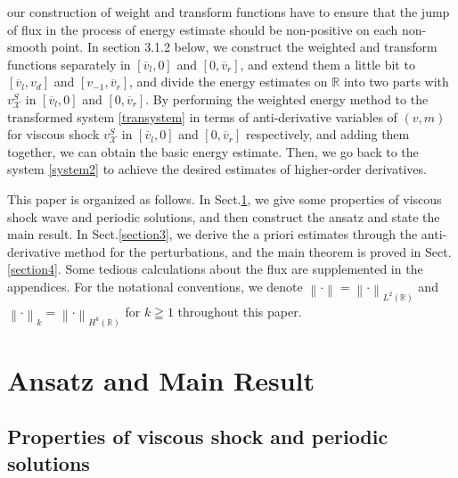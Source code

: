 \documentclass[12pt,reqno]{amsart}
\numberwithin{equation}{section}
\newcommand{\norm}[1]{\left\lVert #1 \right\rVert}
\def\R{\mathbb{R}}
\def\vsx{v^S_{\mathcal{X}}}
\def\avl{\overline{v}_l}
\def\avr{\overline{v}_r}
\begin{document}
our construction of weight and transform functions have to ensure that the jump of flux  in the process of 
energy estimate should be non-positive on each non-smooth point. In section 3.1.2 below, we construct the weighted and transform functions separately in  $[\avl,0]$ and $[0,\avr]$, and extend them a little bit to $[\avl,v_d]$ and $[v_{-1},\avr]$, and divide the energy estimates on $\mathbb{R}$ into two parts with
$\vsx$ in $[\avl,0]$ and $[0,\avr]$. By performing the weighted energy method to the transformed system \eqref{transystem} in terms of anti-derivative variables of $(v,m)$ for viscous shock $\vsx$ in $[\avl,0]$ and $[0,\avr]$ respectively, and adding them together, we can obtain the basic energy estimate. Then, we go back to the system  \eqref{system2} to achieve the desired estimates of higher-order derivatives.

This paper is organized as follows. In Sect.\ref{section2}, we give some properties of viscous shock wave and periodic solutions, and then construct the ansatz and state the main result. In Sect.\ref{section3}, we derive the a priori estimates  through the anti-derivative method for the perturbations, and the main theorem is proved in Sect.\ref{section4}. Some tedious calculations about the flux are supplemented in the appendices. For the notational conventions, we denote $\norm\cdot =\norm\cdot_{L^2(\R)}$ and $\norm \cdot _k=\norm \cdot_{H^k(\R)}$ for $k \geqq 1$ throughout this paper.

\section{Ansatz and Main Result}\label{section2}

\subsection{Properties of viscous shock and periodic solutions}
\end{document}
